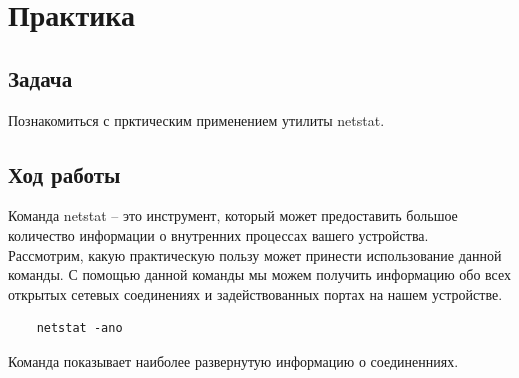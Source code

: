 \chapter{Практика}

\section{Задача}
Познакомиться с прктическим применением утилиты netstat.

\section{Ход работы}

Команда netstat – это инструмент, который может предоставить большое количество
информации о внутренних процессах вашего устройства. \\

Рассмотрим, какую практическую пользу может принести использование данной команды.
С помощью данной команды мы можем получить информацию обо всех открытых сетевых
соединениях и задействованных портах на нашем устройстве.

\begin{lstlisting}
    netstat -ano
\end{lstlisting}

Команда показывает наиболее развернутую информацию о соединенниях.

\endinput